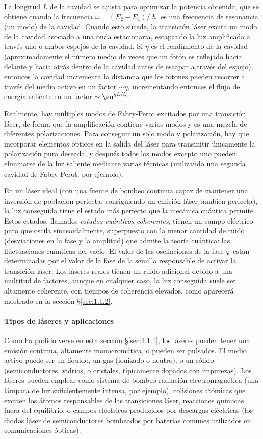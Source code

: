 La longitud $L$ de la cavidad se ajusta para optimizar la potencia obtenida, que se obtiene cuando la frecuencia $\omega = (E_{2}-E_{1})/\hslash $ es una frecuencia de resonancia (un modo) de la cavidad. Cuando esto sucede, la transición láser excita un modo de la cavidad asociado a una onda estacionaria, escapando la luz amplificada a través uno o ambos espejos de la cavidad. Si $\eta$ es el rendimiento de la cavidad (aproximadamente el número medio de veces que un fotón es reflejado hacia delante y hacia atrás dentro de la cavidad antes de escapar a través del espejo), entonces la cavidad incrementa la distancia que los fotones pueden recorrer a través del medio activo en un factor $\sim \eta$, incrementando entonces el flujo de energía saliente en un factor $\sim \eu^{\eta L/l_{o}}$.

Realmente, hay múltiples modos de Fabry-Perot excitados por una transición láser, de forma que la amplificación contiene varios modos y es una mezcla de diferentes polarizaciones. Para conseguir un solo modo y polarización, hay que incorporar elementos ópticos en la salida del láser para transmitir únicamente la polarización pura deseada, y después todos los modos excepto uno pueden eliminarse de la luz saliente mediante varias técnicas (utilizando una segunda cavidad de Fabry-Perot, por ejemplo).

En un láser ideal (con una fuente de bombeo continua capaz de mantener una inversión de población perfecta, consiguiendo un emisión láser también perfecta), la luz conseguida tiene el estado más perfecto que la mecánica cuántica permite. Estos estados, llamados \emph{estados cuánticos coherentes}, tienen un campo eléctrico puro que oscila sinusoidalmente, superpuesto con la menor cantidad de ruido (desviaciones en la fase y la amplitud) que admite la teoría cuántica: las fluctuaciones cuánticas del vacío. El valor de las oscilaciones de la fase $\varphi$ están determinadas por el valor de la fase de la semilla responsable de activar la transición láser. Los láseres reales tienen un ruido adicional debido a una multitud de factores, aunque en cualquier caso, la luz conseguida suele ser altamente coherente, con tiempos de coherencia elevados, como aparecerá mostrado en la sección \S\ref{sec:1.1.2}.

\paragraph{Tipos de láseres y aplicaciones}
Como ha podido verse en esta sección \S\ref{sec:1.1.1}, los láseres pueden tener una emisión continua, altamente monocromática, o pueden ser pulsados. El medio activo puede ser un líquido, un gas (ionizado o neutro), o un sólido (semiconductores, vidrios, o cristales, típicamente dopados con impurezas). Los láseres pueden emplear como sistema de bombeo radiación electromagnética (una lámpara de luz suficientemente intensa, por ejemplo), colisiones atómicas que exciten los átomos responsables de las transiciones láser, reacciones químicas fuera del equilibrio, o campos eléctricos producidos por descargas eléctricas (los diodos láser de semiconductores bombeados por baterías comunes utilizados en comunicaciones ópticas).

